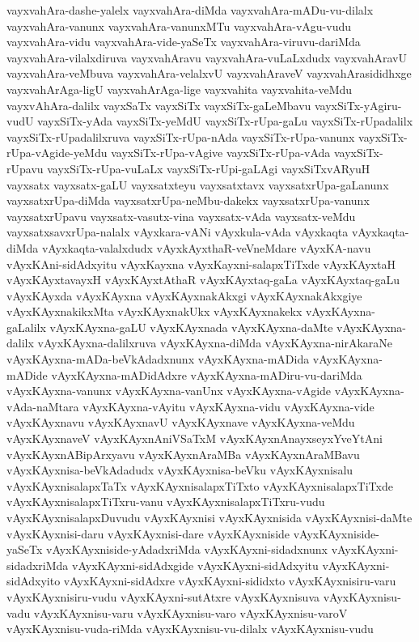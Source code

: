 {vayxvahAra-dashe-yalelx
vayxvahAra-diMda
vayxvahAra-mADu-vu-dilalx
vayxvahAra-vanunx
vayxvahAra-vanunxMTu
vayxvahAra-vAgu-vudu
vayxvahAra-vidu
vayxvahAra-vide-yaSeTx
vayxvahAra-viruvu-dariMda
vayxvahAra-vilalxdiruva
vayxvahAravu
vayxvahAra-vuLaLxdudx
vayxvahAravU
vayxvahAra-veMbuva
vayxvahAra-velalxvU
vayxvahAraveV
vayxvahArasididhxge
vayxvahArAga-ligU
vayxvahArAga-lige
vayxvahita
vayxvahita-veMdu
vayxvAhAra-dalilx
vayxSaTx
vayxSiTx
vayxSiTx-gaLeMbavu
vayxSiTx-yAgiru-vudU
vayxSiTx-yAda
vayxSiTx-yeMdU
vayxSiTx-rUpa-gaLu
vayxSiTx-rUpadalilx
vayxSiTx-rUpadalilxruva
vayxSiTx-rUpa-nAda
vayxSiTx-rUpa-vanunx
vayxSiTx-rUpa-vAgide-yeMdu
vayxSiTx-rUpa-vAgive
vayxSiTx-rUpa-vAda
vayxSiTx-rUpavu
vayxSiTx-rUpa-vuLaLx
vayxSiTx-rUpi-gaLAgi
vayxSiTxvARyuH
vayxsatx
vayxsatx-gaLU
vayxsatxteyu
vayxsatxtavx
vayxsatxrUpa-gaLanunx
vayxsatxrUpa-diMda
vayxsatxrUpa-neMbu-dakekx
vayxsatxrUpa-vanunx
vayxsatxrUpavu
vayxsatx-vasutx-vina
vayxsatx-vAda
vayxsatx-veMdu
vayxsatxsavxrUpa-nalalx
vAyxkara-vANi
vAyxkula-vAda
vAyxkaqta
vAyxkaqta-diMda
vAyxkaqta-valalxdudx
vAyxkAyxthaR-veVneMdare
vAyxKA-navu
vAyxKAni-sidAdxyitu
vAyxKayxna
vAyxKayxni-salapxTiTxde
vAyxKAyxtaH
vAyxKAyxtavayxH
vAyxKAyxtAthaR
vAyxKAyxtaq-gaLa
vAyxKAyxtaq-gaLu
vAyxKAyxda
vAyxKAyxna
vAyxKAyxnakAkxgi
vAyxKAyxnakAkxgiye
vAyxKAyxnakikxMta
vAyxKAyxnakUkx
vAyxKAyxnakekx
vAyxKAyxna-gaLalilx
vAyxKAyxna-gaLU
vAyxKAyxnada
vAyxKAyxna-daMte
vAyxKAyxna-dalilx
vAyxKAyxna-dalilxruva
vAyxKAyxna-diMda
vAyxKAyxna-nirAkaraNe
vAyxKAyxna-mADa-beVkAdadxnunx
vAyxKAyxna-mADida
vAyxKAyxna-mADide
vAyxKAyxna-mADidAdxre
vAyxKAyxna-mADiru-vu-dariMda
vAyxKAyxna-vanunx
vAyxKAyxna-vanUnx
vAyxKAyxna-vAgide
vAyxKAyxna-vAda-naMtara
vAyxKAyxna-vAyitu
vAyxKAyxna-vidu
vAyxKAyxna-vide
vAyxKAyxnavu
vAyxKAyxnavU
vAyxKAyxnave
vAyxKAyxna-veMdu
vAyxKAyxnaveV
vAyxKAyxnAniVSaTxM
vAyxKAyxnAnayxseyxYveYtAni
vAyxKAyxnABipArxyavu
vAyxKAyxnAraMBa
vAyxKAyxnAraMBavu
vAyxKAyxnisa-beVkAdadudx
vAyxKAyxnisa-beVku
vAyxKAyxnisalu
vAyxKAyxnisalapxTaTx
vAyxKAyxnisalapxTiTxto
vAyxKAyxnisalapxTiTxde
vAyxKAyxnisalapxTiTxru-vanu
vAyxKAyxnisalapxTiTxru-vudu
vAyxKAyxnisalapxDuvudu
vAyxKAyxnisi
vAyxKAyxnisida
vAyxKAyxnisi-daMte
vAyxKAyxnisi-daru
vAyxKAyxnisi-dare
vAyxKAyxniside
vAyxKAyxniside-yaSeTx
vAyxKAyxniside-yAdadxriMda
vAyxKAyxni-sidadxnunx
vAyxKAyxni-sidadxriMda
vAyxKAyxni-sidAdxgide
vAyxKAyxni-sidAdxyitu
vAyxKAyxni-sidAdxyito
vAyxKAyxni-sidAdxre
vAyxKAyxni-sididxto
vAyxKAyxnisiru-varu
vAyxKAyxnisiru-vudu
vAyxKAyxni-sutAtxre
vAyxKAyxnisuva
vAyxKAyxnisu-vadu
vAyxKAyxnisu-varu
vAyxKAyxnisu-varo
vAyxKAyxnisu-varoV
vAyxKAyxnisu-vuda-riMda
vAyxKAyxnisu-vu-dilalx
vAyxKAyxnisu-vudu
}
